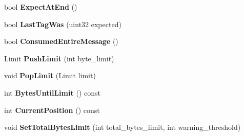 \begin{DoxyCompactItemize}
\item 
\mbox{\label{classgoogle_1_1protobuf_1_1io_1_1CodedInputStream_a3ced15ff85cea91fdb02f9e2909a8c42}} 
bool {\bfseries Expect\+At\+End} ()
\item 
\mbox{\label{classgoogle_1_1protobuf_1_1io_1_1CodedInputStream_a00d69e1980355010ed8155ba9d07e317}} 
bool {\bfseries Last\+Tag\+Was} (uint32 expected)
\item 
\mbox{\label{classgoogle_1_1protobuf_1_1io_1_1CodedInputStream_a744076090ae508f8717ad03cc3e65bb8}} 
bool {\bfseries Consumed\+Entire\+Message} ()
\item 
\mbox{\label{classgoogle_1_1protobuf_1_1io_1_1CodedInputStream_aa4c636f5da1d7ed3a5dd4952e2bcc64c}} 
Limit {\bfseries Push\+Limit} (int byte\+\_\+limit)
\item 
\mbox{\label{classgoogle_1_1protobuf_1_1io_1_1CodedInputStream_ae007771c7291209d3623a88658a21ec7}} 
void {\bfseries Pop\+Limit} (Limit limit)
\item 
\mbox{\label{classgoogle_1_1protobuf_1_1io_1_1CodedInputStream_a8068fb0d746b305433ce3490a1edb59e}} 
int {\bfseries Bytes\+Until\+Limit} () const
\item 
\mbox{\label{classgoogle_1_1protobuf_1_1io_1_1CodedInputStream_a09cefb6a92d21847384f43ce2470c151}} 
int {\bfseries Current\+Position} () const
\item 
\mbox{\label{classgoogle_1_1protobuf_1_1io_1_1CodedInputStream_a98cb2741214e8d5a36d035363bd92637}} 
void {\bfseries Set\+Total\+Bytes\+Limit} (int total\+\_\+bytes\+\_\+limit, int warning\+\_\+threshold)
\item 
\mbox{\label{classgoogle_1_1protobuf_1_1io_1_1CodedInputStream_a8baa813503e44b6bf2e78191cfd16261}} 

\end{DoxyCompactItemize}
